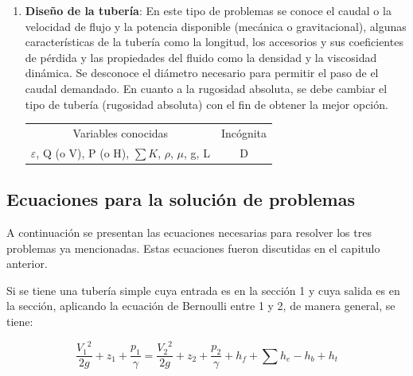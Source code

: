 \documentclass[10pt, oneside]{article}
\begin{document}
\begin{enumerate}
\item \textbf{Dise\~no de la tuber\'ia}: En este tipo de problemas se conoce el caudal o la velocidad de flujo y la potencia disponible (mec\'anica o gravitacional), algunas caracter\'isticas de la tuber\'ia como la longitud, los accesorios y sus coeficientes de p\'erdida y las propiedades del fluido como la densidad y la viscosidad din\'amica. Se desconoce el di\'ametro necesario para permitir el paso de el caudal demandado. En cuanto a la rugosidad absoluta, se debe cambiar el tipo de tuber\'ia (rugosidad absoluta) con el fin de obtener la mejor opci\'on. 

\begin{table}[h!]
\centering
\begin{tabular}{c c}
 \hline
 Variables conocidas & Inc\'ognita \\ [0.5ex]
$\varepsilon$, Q (o V), P (o H), $\sum K$, $\rho$, $\mu$, g, L &  D \\
\hline
\end{tabular}
\end{table}
 \end{enumerate}

\subsection{Ecuaciones para la soluci\'on de problemas}
A continuaci\'on se presentan las ecuaciones necesarias para resolver los tres problemas ya mencionadas. Estas ecuaciones fueron discutidas en el capitulo anterior. 

Si se tiene una tuber\'ia simple cuya entrada es en la secci\'on 1 y cuya salida es en la secci\'on, aplicando la ecuaci\'on de Bernoulli entre 1 y 2, de manera general,  se tiene:


\begin{equation}
\frac{{V_1}^2}{2g}+ z_1 + \frac{p_1}{\gamma} =  \frac{{V_2}^2}{2g}+ z_2 + \frac{p_2}{\gamma} + h_f + \sum h_e - h_b + h_t
\label{com1}
\end{equation}
\end{document}
